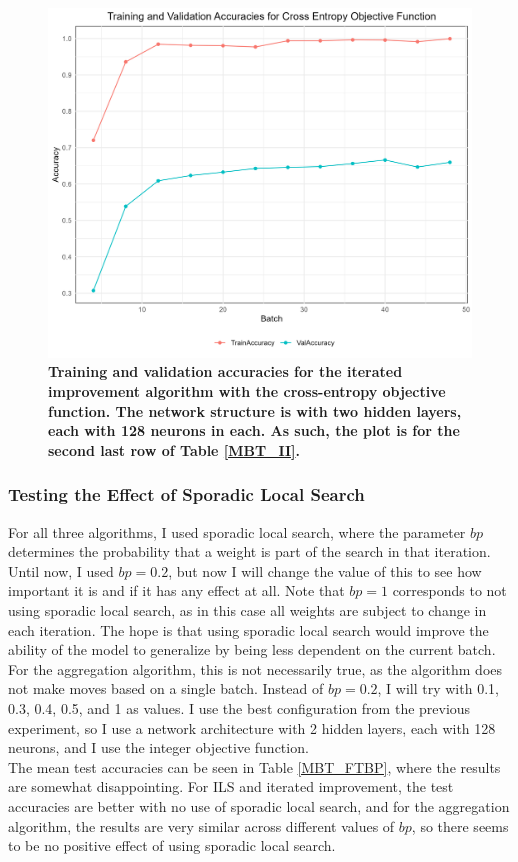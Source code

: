 \begin{figure}[H]
    \centering
    \includegraphics[width=1\linewidth]{Figures/MBT_II_CROSS_ENTROPY.png}
    \caption{\small{\textbf{Training and validation accuracies for the iterated improvement algorithm with the cross-entropy objective function. The network structure is with two hidden layers, each with 128 neurons in each. As such, the plot is for the second last row of Table \ref{MBT_II}.}}}
    \label{MBT_II_CROSS_ENTROPY_FUNCTION}
\end{figure}

\subsubsection{Testing the Effect of Sporadic Local Search}
For all three algorithms, I used sporadic local search, where the parameter $bp$ determines the probability that a weight is part of the search in that iteration. Until now, I used $bp=0.2$, but now I will change the value of this to see how important it is and if it has any effect at all. Note that $bp=1$ corresponds to not using sporadic local search, as in this case all weights are subject to change in each iteration. The hope is that using sporadic local search would improve the ability of the model to generalize by being less dependent on the current batch. For the aggregation algorithm, this is not necessarily true, as the algorithm does not make moves based on a single batch. Instead of $bp=0.2$, I will try with 0.1, 0.3, 0.4, 0.5, and 1 as values. I use the best configuration from the previous experiment, so I use a network architecture with 2 hidden layers, each with 128 neurons, and I use the integer objective function. \\
\noindent The mean test accuracies can be seen in Table \ref{MBT_FTBP}, where the results are somewhat disappointing. For ILS and iterated improvement, the test accuracies are better with no use of sporadic local search, and for the aggregation algorithm, the results are very similar across different values of $bp$, so there seems to be no positive effect of using sporadic local search. 


